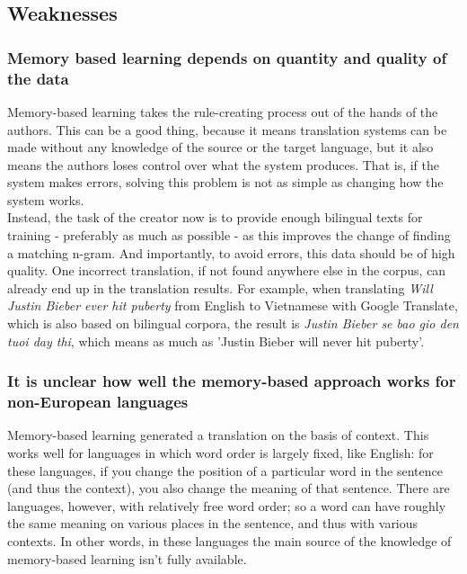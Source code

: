 \documentclass[12pt]{article}
\begin{document}

\subsection{Weaknesses}

\subsubsection{Memory based learning depends on quantity and quality of the data}

Memory-based learning takes the rule-creating process out of the hands of the authors. This can be a good thing, because it means translation systems can be made without any knowledge of the source or the target language, but it also means the authors loses control over what the system produces. That is, if the system makes errors, solving this problem is not as simple as changing how the system works. \\\indent
Instead, the task of the creator now is to provide enough bilingual texts for training - preferably as much as possible - as this improves the change of finding a matching n-gram. And importantly, to avoid errors, this data should be of high quality. One incorrect translation, if not found anywhere else in the corpus, can already end up in the translation results. For example, when translating \emph{Will Justin Bieber ever hit puberty} from English to Vietnamese with Google Translate, which is also based on bilingual corpora, the result is \emph{Justin Bieber se bao gio den tuoi day thi}, which means as much as 'Justin Bieber will never hit puberty'.

\subsubsection{It is unclear how well the memory-based approach works for non-European languages}

Memory-based learning generated a translation on the basis of context. This works well for languages in which word order is largely fixed, like English: for these languages, if you change the position of a particular word in the sentence (and thus the context), you also change the meaning of that sentence. There are languages, however, with relatively free word order; so a word can have roughly the same meaning on various places in the sentence, and thus with various contexts. In other words, in these languages the main source of the knowledge of memory-based learning isn't fully available.
\end{document}
